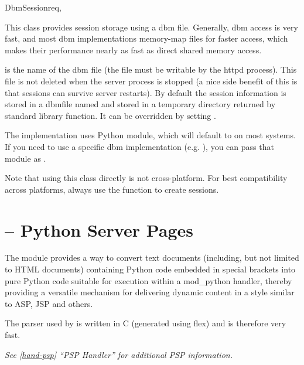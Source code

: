 \begin{classdesc}{DbmSession}{req, }

  This class provides session storage using a dbm file. Generally, dbm
  access is very fast, and most dbm implementations memory-map files
  for faster access, which makes their performance nearly as fast as
  direct shared memory access.

   is the name of the dbm file (the file must be writable by
  the httpd process). This file is not deleted when the server process
  is stopped (a nice side benefit of this is that sessions can survive
  server restarts). By default the session information is stored in a
  dbmfile named  and stored in a temporary directory
  returned by  standard library
  function. It can be overridden by setting .

  The implementation uses Python  module, which will
  default to  on most systems. If you need to use a
  specific dbm implementation (e.g. ), you can pass that
  module as .

  Note that using this class directly is not cross-platform. For best
  compatibility across platforms, always use the 
  function to create sessions.

\end{classdesc}

\section{ -- Python Server Pages\label{pyapi-psp}}

The  module provides a way to convert text documents
(including, but not limited to HTML documents) containing Python code
embedded in special brackets into pure Python code suitable for
execution within a mod_python handler, thereby providing a versatile
mechanism for delivering dynamic content in a style similar to ASP,
JSP and others.

The parser used by  is written in C (generated using flex)
and is therefore very fast.

\emph{See \ref{hand-psp} ``PSP Handler'' for additional PSP
information.}

